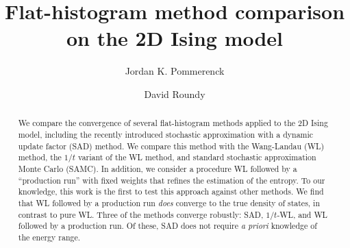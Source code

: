 \documentclass[letterpaper,twocolumn,amsmath,amssymb,pre,aps,10pt]{revtex4-1}
\begin{document}
\title{Flat-histogram method comparison on the 2D Ising model
}

\author{Jordan K. Pommerenck} \author{David Roundy}

\begin{abstract}
We compare the convergence of several flat-histogram methods applied
to the 2D Ising model, including the recently introduced stochastic
approximation with a dynamic update factor (SAD) method.  We compare
this method with the Wang-Landau (WL) method, the $1/t$ variant of
the WL method, and standard stochastic approximation Monte Carlo
(SAMC).  In addition, we consider a procedure WL followed by a
``production run'' with fixed weights that refines the estimation of
the entropy.  To our knowledge, this work is the first to test this
approach against other methods. We find that WL followed by a production run \emph{does} converge to
the true density of states, in contrast to pure WL.  Three of the
methods converge robustly: SAD, $1/t$-WL, and WL followed by a
production run.  Of these, SAD does not require \emph{a priori}
knowledge of the energy range.
\end{abstract}

\maketitle




\end{document}
